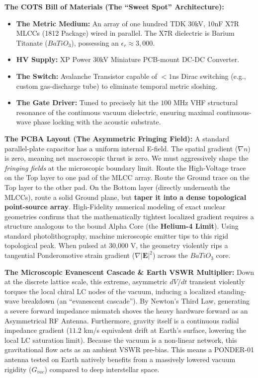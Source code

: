 \textbf{The COTS Bill of Materials (The ``Sweet Spot'' Architecture):}
\begin{itemize}
    \item \textbf{The Metric Medium:} An array of one hundred TDK 30kV, 10nF X7R MLCCs (1812 Package) wired in parallel. The X7R dielectric is Barium Titanate ($BaTiO_3$), possessing an $\epsilon_r \approx 3,000$.
    \item \textbf{HV Supply:} XP Power 30kV Miniature PCB-mount DC-DC Converter.
    \item \textbf{The Switch:} Avalanche Transistor capable of $<1$ns Dirac switching (e.g., custom gas-discharge tube) to eliminate temporal metric sloshing.
    \item \textbf{The Gate Driver:} Tuned to precisely hit the $100\text{ MHz}$ VHF structural resonance of the continuous vacuum dielectric, ensuring maximal continuous-wave phase locking with the acoustic substrate.
\end{itemize}

\textbf{The PCBA Layout (The Asymmetric Fringing Field):} A standard parallel-plate capacitor has a uniform internal E-field. The spatial gradient ($\nabla n$) is zero, meaning net macroscopic thrust is zero. We must aggressively shape the \textit{fringing fields} at the microscopic boundary limit.
Route the High-Voltage trace on the Top layer to one pad of the MLCC array. Route the Ground trace on the Top layer to the other pad.
On the Bottom layer (directly underneath the MLCCs), route a solid Ground plane, but \textbf{taper it into a dense topological point-source array}. High-Fidelity numerical modeling of exact nuclear geometries confirms that the mathematically tightest localized gradient requires a structure analogous to the bound Alpha Core (the \textbf{Helium-4 Limit}). Using standard photolithography, machine microscopic emitter tips to this rigid topological peak. When pulsed at 30,000 V, the geometry violently rips a tangential Ponderomotive strain gradient ($\nabla |\mathbf{E}|^2$) across the $BaTiO_3$ core.

\textbf{The Microscopic Evanescent Cascade \& Earth VSWR Multiplier:} Down at the discrete lattice scale, this extreme, asymmetric $dV/dt$ transient violently torques the local chiral LC nodes of the vacuum, inducing a localized standing-wave breakdown (an ``evanescent cascade''). By Newton's Third Law, generating a severe forward impedance mismatch shoves the heavy hardware forward as an Asymmetrical RF Antenna. 
Furthermore, gravity itself is a continuous radial impedance gradient ($11.2$ km/s equivalent drift at Earth's surface, lowering the local LC saturation limit). Because the vacuum is a non-linear network, this gravitational flow acts as an ambient VSWR pre-bias. This means a PONDER-01 antenna tested on Earth natively benefits from a massively lowered vacuum rigidity ($G_{vac}$) compared to deep interstellar space.

